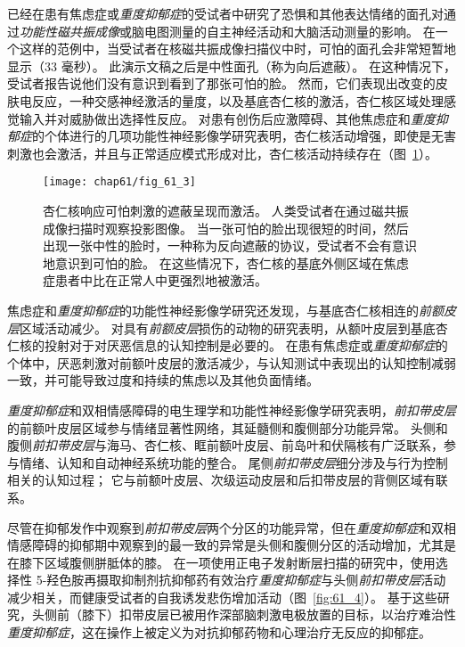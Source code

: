 已经在患有焦虑症或\textit{重度抑郁症}的受试者中研究了恐惧和其他表达情绪的面孔对通过\textit{功能性磁共振成像}或脑电图测量的自主神经活动和大脑活动测量的影响。
在一个这样的范例中，当受试者在核磁共振成像扫描仪中时，可怕的面孔会非常短暂地显示（33 毫秒）。
此演示文稿之后是中性面孔（称为向后遮蔽）。
在这种情况下，受试者报告说他们没有意识到看到了那张可怕的脸。
然而，它们表现出改变的皮肤电反应，一种交感神经激活的量度，以及基底杏仁核的激活，杏仁核区域处理感觉输入并对威胁做出选择性反应。
对患有创伤后应激障碍、其他焦虑症和\textit{重度抑郁症}的个体进行的几项功能性神经影像学研究表明，杏仁核活动增强，即使是无害刺激也会激活，并且与正常适应模式形成对比，杏仁核活动持续存在（图~\ref{fig:61_3}）。


\begin{figure}[htbp]
	\centering
	\texttt{[image: chap61/fig\_61\_3]}
	\caption{杏仁核响应可怕刺激的遮蔽呈现而激活。
		人类受试者在通过磁共振成像扫描时观察投影图像。
		当一张可怕的脸出现很短的时间，然后出现一张中性的脸时，一种称为反向遮蔽的协议，受试者不会有意识地意识到可怕的脸。
		在这些情况下，杏仁核的基底外侧区域在焦虑症患者中比在正常人中更强烈地被激活\cite{etkin2004individual}。}
	\label{fig:61_3}
\end{figure}


焦虑症和\textit{重度抑郁症}的功能性神经影像学研究还发现，与基底杏仁核相连的\textit{前额皮层}区域活动减少。
对具有\textit{前额皮层}损伤的动物的研究表明，从额叶皮层到基底杏仁核的投射对于对厌恶信息的认知控制是必要的。
在患有焦虑症或\textit{重度抑郁症}的个体中，厌恶刺激对前额叶皮层的激活减少，与认知测试中表现出的认知控制减弱一致，并可能导致过度和持续的焦虑以及其他负面情绪。


\textit{重度抑郁症}和双相情感障碍的电生理学和功能性神经影像学研究表明，\textit{前扣带皮层}的前额叶皮层区域参与情绪显著性网络，其延髓侧和腹侧部分功能异常。
头侧和腹侧\textit{前扣带皮层}与海马、杏仁核、眶前额叶皮层、前岛叶和伏隔核有广泛联系，参与情绪、认知和自动神经系统功能的整合。
尾侧\textit{前扣带皮层}细分涉及与行为控制相关的认知过程；
它与前额叶皮层、次级运动皮层和后扣带皮层的背侧区域有联系。


尽管在抑郁发作中观察到\textit{前扣带皮层}两个分区的功能异常，但在\textit{重度抑郁症}和双相情感障碍的抑郁期中观察到的最一致的异常是头侧和腹侧分区的活动增加，尤其是在膝下区域腹侧胼胝体的膝。
在一项使用正电子发射断层扫描的研究中，使用选择性 5-羟色胺再摄取抑制剂抗抑郁药有效治疗\textit{重度抑郁症}与头侧\textit{前扣带皮层}活动减少相关，而健康受试者的自我诱发悲伤增加活动（图~\ref{fig:61_4}）。
基于这些研究，头侧前（膝下）扣带皮层已被用作深部脑刺激电极放置的目标，以治疗难治性\textit{重度抑郁症}，这在操作上被定义为对抗抑郁药物和心理治疗无反应的抑郁症。


